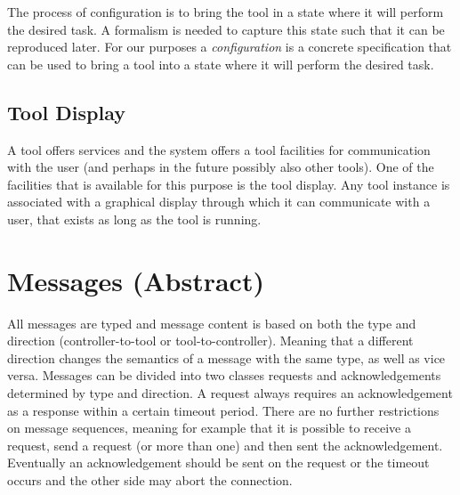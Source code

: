 \documentclass{article}
\begin{document}
   The process of configuration is to bring the tool in a state where it will
   perform the desired task. A formalism is needed to capture this state such
   that it can be reproduced later. For our purposes a \textit{configuration}
   is a concrete specification that can be used to bring a tool into a state
   where it will perform the desired task.

  \subsection{Tool Display}

   A tool offers services and the system offers a tool facilities for
   communication with the user (and perhaps in the future possibly also other
   tools). One of the facilities that is available for this purpose is the tool
   display. Any tool instance is associated with a graphical display through
   which it can communicate with a user, that exists as long as the tool is
   running.
   

  
 \section{Messages (Abstract)} \label{s:message_definitions}

  All messages are typed and message content is based on both the type and
  direction (controller-to-tool or tool-to-controller). Meaning that a
  different direction changes the semantics of a message with the same type, as
  well as vice versa. Messages can be divided into two classes requests and
  acknowledgements determined by type and direction. A request always requires
  an acknowledgement as a response within a certain timeout period. There are
  no further restrictions on message sequences, meaning for example that it is
  possible to receive a request, send a request (or more than one) and then
  sent the acknowledgement. Eventually an acknowledgement should be sent on the
  request or the timeout occurs and the other side may abort the connection.
  
\end{document}

